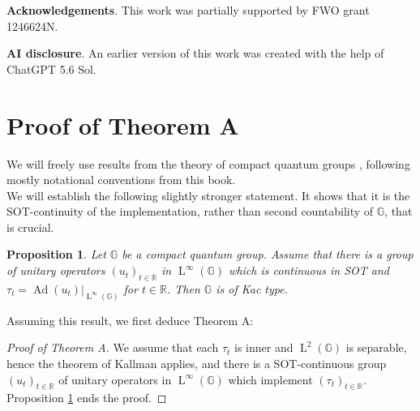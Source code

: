 \documentclass{amsart}
\newcommand{\RR}{\mathbb{R}}
\newcommand{\GG}{\mathbb{G}}
\newcommand{\oon}{\operatorname}
\DeclareMathOperator{\LL}{L}
\newtheorem{proposition}[theorem]{Proposition}
\theoremstyle{definition}
\numberwithin{equation}{section}
\begin{document}
\textbf{Acknowledgements}. This work was partially supported by FWO grant 1246624N. 

\textbf{AI disclosure}. An earlier version of this work was created with the help of ChatGPT 5.6 Sol.

\section{Proof of Theorem A}\label{sec:preliminaries}

We will freely use results from the theory of compact quantum groups \cite{NeshveyevTuset}, following mostly notational conventions from this book. \\

We will establish the following slightly stronger statement. It shows that it is the SOT-continuity of the implementation, rather than second countability of $\GG$, that is crucial.

\begin{proposition}\label{prop1}
Let $\GG$ be a compact quantum group. Assume that there is a group of unitary operators $(u_t)_{t\in \RR}$ in $\LL^{\infty}(\GG)$ which is continuous in SOT and $\tau_t=\oon{Ad}(u_t)|_{\LL^{\infty}(\GG)}$ for $t\in\RR$. Then $\GG$ is of Kac type.
\end{proposition}

Assuming this result, we first deduce Theorem A:

\begin{proof}[Proof of Theorem A]
We assume that each $\tau_t$ is inner and $\LL^2(\GG)$ is separable, hence the theorem of Kallman \cite{KallmanInner} applies, and there is a SOT-continuous group $(u_t)_{t\in \RR}$ of unitary operators in $\LL^{\infty}(\GG)$ which implement $(\tau_t)_{t\in\RR}$. Proposition \ref{prop1} ends the proof.
\end{proof}
\end{document}
